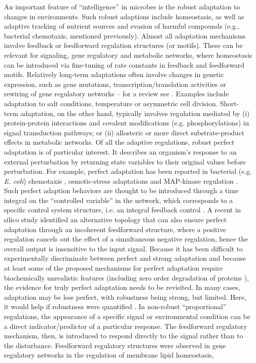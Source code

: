 An important feature of ``intelligence'' in microbes is the robust adaptation to changes in environments. Such robust adaptions include homeostasis, as well as adaptive tracking of nutrient sources \cite{patnaik_are_2000} and evasion of harmful compounds (e.g., bacterial chemotaxis, mentioned previously). Almost all adaptation mechanisms involve feedback or feedforward regulation structures (or motifs). These can be relevant for signaling, gene regulatory and metabolic networks, where homeostasis can be introduced via fine-tuning of rate constants in feedback and feedforward motifs. Relatively long-term adaptations often involve changes in genetic expression, such as gene mutations, transcription/translation activities or rewiring of gene regulatory networks – for a review see \cite{brooks_adaptation_2011}. Examples include adaptation to salt conditions, temperature or asymmetric cell division. Short-term adaptation, on the other hand, typically involves regulation mediated by (i) protein-protein interactions and covalent modifications (e.g. phosphorylations) in signal transduction pathways; or (ii) allosteric or more direct substrate-product effects in metabolic networks. Of all the adaptive regulations, robust perfect adaptation is of particular interest. It describes an organism’s response to an external perturbation by returning state variables to their original values before perturbation. For example, perfect adaptation has been reported in bacterial (e.g. \textit{E. coli}) chemotaxis \cite{berg_transient_1975,alon_robustness_1999,yi_robust_2000,hansen_chemotaxis_2008}, osmotic-stress adaptations \cite{muzzey_systems-level_2009} and MAP-kinase regulation \cite{hao_systems_2007,mettetal_frequency_2008}. Such perfect adaption behaviors are thought to be introduced through a time integral on the “controlled variable” in the network, which corresponds to a specific control system structure, i.e. an integral feedback control \cite{csete_reverse_2002}. A recent in silico study \cite{ma_proteus_2012} identified an alternative topology that can also ensure perfect adaptation through an incoherent feedforward structure, where a positive regulation cancels out the effect of a simultaneous negative regulation, hence the overall output is insensitive to the input signal. Because it has been difficult to experimentally discriminate between perfect and strong adaptation and because at least some of the proposed mechanisms for perfect adaptation require biochemically unrealistic features (including zero order degradation of proteins \cite{he_imperfect_2013}), the evidence for truly perfect adaptation needs to be revisited. In many cases, adaptation may be less perfect, with robustness being strong, but limited. Here, it would help if robustness were quantified \cite{quinton-tulloch_trade-off_2013}. In non-robust ``proportional'' \cite{he_imperfect_2013} regulations, the appearance of a specific signal or environmental condition can be a direct indicator/predictor of a particular response. The feedforward regulatory mechanism, then, is introduced to respond directly to the signal rather than to the disturbance. Feedforward regulatory structures were observed in gene regulatory networks in the regulation of membrane lipid homeostasis\cite{mangan_structure_2003,albanesi_structural_2013}, 